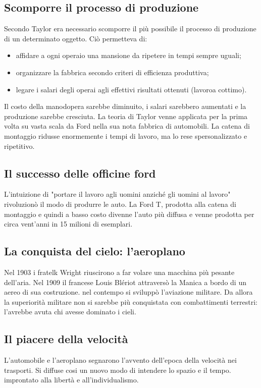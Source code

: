 \documentclass{report}
\begin{document}
\subsection{Scomporre il processo di produzione}
Secondo Taylor era necessario scomporre il più possibile il processo di produzione di un determinato oggetto. Ciò permetteva di:
\begin{itemize}
  \item affidare a ogni operaio una mansione da ripetere in tempi sempre uguali;
  \item organizzare la fabbrica secondo criteri di efficienza produttiva;
  \item legare i salari degli operai agli effettivi risultati ottenuti (lavoroa cottimo).
\end{itemize}

Il costo della manodopera sarebbe diminuito, i salari sarebbero aumentati e la produzione sarebbe cresciuta. La teoria di Taylor venne applicata per la prima volta su vasta scala da Ford nella sua nota fabbrica di automobili. La catena di montaggio ridusse enormemente i tempi di lavoro, ma lo rese spersonalizzato e ripetitivo.

\subsection{Il successo delle officine ford}
L'intuizione di "portare il lavoro agli uomini anziché gli uomini al lavoro" rivoluzionò il modo di produrre le auto. La Ford T, prodotta alla catena di montaggio e quindi a basso costo divenne l'auto più diffusa e venne prodotta per circa vent'anni in 15 milioni di esemplari.

\subsection{La conquista del cielo: l'aeroplano}
Nel 1903 i fratelk Wright riuscirono a far volare una macchina più pesante dell'aria. Nel 1909 il francese Louis Blériot attraversò la Manica a bordo di un aereo di sua costruzione. nel contempo si sviluppò l'aviazione militare. Da allora la superiorità militare non si sarebbe più conquistata con combattimenti terrestri: l'avrebbe avuta chi avesse dominato i cieli.

\subsection{Il piacere della velocità}
L'automobile e l'aeroplano segnarono l'avvento dell'epoca della velocità nei trasporti. Si diffuse cosi un nuovo modo di intendere lo spazio e il tempo. improntato alla libertà e all'individualismo.
\end{document}
